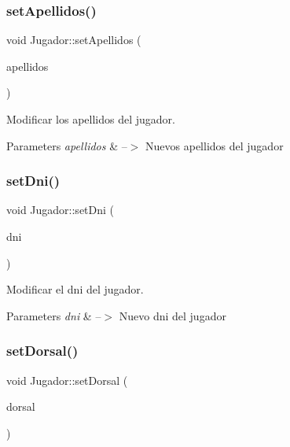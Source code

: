 \subsubsection{\texorpdfstring{set\+Apellidos()}{setApellidos()}}
{\footnotesize\ttfamily void Jugador\+::set\+Apellidos (\begin{DoxyParamCaption}\item[{Q\+String}]{apellidos }\end{DoxyParamCaption})}



Modificar los apellidos del jugador. 


\begin{DoxyParams}{Parameters}
{\em apellidos} & --$>$ Nuevos apellidos del jugador \\
\hline
\end{DoxyParams}
\mbox{\label{classJugador_af2b5ddb5d0b2cc80867ba54cf4cea564}} 
\subsubsection{\texorpdfstring{set\+Dni()}{setDni()}}
{\footnotesize\ttfamily void Jugador\+::set\+Dni (\begin{DoxyParamCaption}\item[{Q\+String}]{dni }\end{DoxyParamCaption})}



Modificar el dni del jugador. 


\begin{DoxyParams}{Parameters}
{\em dni} & --$>$ Nuevo dni del jugador \\
\hline
\end{DoxyParams}
\mbox{\label{classJugador_a08e9a676f4710c0635d02e129d7cb7d0}} 
\subsubsection{\texorpdfstring{set\+Dorsal()}{setDorsal()}}
{\footnotesize\ttfamily void Jugador\+::set\+Dorsal (\begin{DoxyParamCaption}\item[{int}]{dorsal }\end{DoxyParamCaption})}



